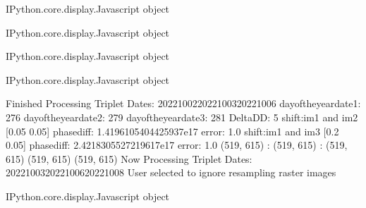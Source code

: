 \documentclass[letterpaper,10pt]{sphinxmanual}
\begin{document}
\begin{sphinxVerbatim}[commandchars=\\\{\}]
\PYGZlt{}IPython.core.display.Javascript object\PYGZgt{}
\end{sphinxVerbatim}



\begin{sphinxVerbatim}[commandchars=\\\{\}]
\PYGZlt{}IPython.core.display.Javascript object\PYGZgt{}
\end{sphinxVerbatim}



\begin{sphinxVerbatim}[commandchars=\\\{\}]
\PYGZlt{}IPython.core.display.Javascript object\PYGZgt{}
\end{sphinxVerbatim}



\begin{sphinxVerbatim}[commandchars=\\\{\}]
\PYGZlt{}IPython.core.display.Javascript object\PYGZgt{}
\end{sphinxVerbatim}



\begin{sphinxVerbatim}[commandchars=\\\{\}]
Finished Processing Triplet Dates:  20221002\PYGZhy{}20221003\PYGZhy{}20221006
day\PYGZus{}of\PYGZus{}the\PYGZus{}year\PYGZus{}date1:  276
\PYGZhy{}\PYGZhy{}\PYGZhy{}\PYGZhy{}\PYGZhy{}\PYGZhy{}\PYGZhy{}\PYGZhy{}\PYGZhy{}\PYGZhy{}\PYGZhy{}\PYGZhy{}\PYGZhy{}\PYGZhy{}\PYGZhy{}\PYGZhy{}\PYGZhy{}\PYGZhy{}\PYGZhy{}\PYGZhy{}\PYGZhy{}
day\PYGZus{}of\PYGZus{}the\PYGZus{}year\PYGZus{}date2:  279
\PYGZhy{}\PYGZhy{}\PYGZhy{}\PYGZhy{}\PYGZhy{}\PYGZhy{}\PYGZhy{}\PYGZhy{}\PYGZhy{}\PYGZhy{}\PYGZhy{}\PYGZhy{}\PYGZhy{}\PYGZhy{}\PYGZhy{}\PYGZhy{}\PYGZhy{}\PYGZhy{}\PYGZhy{}\PYGZhy{}\PYGZhy{}
day\PYGZus{}of\PYGZus{}the\PYGZus{}year\PYGZus{}date3:  281
\PYGZhy{}\PYGZhy{}\PYGZhy{}\PYGZhy{}\PYGZhy{}\PYGZhy{}\PYGZhy{}\PYGZhy{}\PYGZhy{}\PYGZhy{}\PYGZhy{}\PYGZhy{}\PYGZhy{}\PYGZhy{}\PYGZhy{}\PYGZhy{}\PYGZhy{}\PYGZhy{}\PYGZhy{}\PYGZhy{}\PYGZhy{}
Delta\PYGZus{}DD: 5
shift:im1 and im2 [0.05 0.05] phasediff: \PYGZhy{}1.4196105404425937e\PYGZhy{}17 error: 1.0
shift:im1 and im3 [\PYGZhy{}0.2  \PYGZhy{}0.05] phasediff: \PYGZhy{}2.4218305527219617e\PYGZhy{}17 error: 1.0
(519, 615) :  (519, 615) :  (519, 615)
(519, 615)
(519, 615)
Now Processing Triplet Dates:  20221003\PYGZhy{}20221006\PYGZhy{}20221008
 User selected to ignore resampling raster images 



\PYGZlt{}IPython.core.display.Javascript object\PYGZgt{}
\end{sphinxVerbatim}
\end{document}
